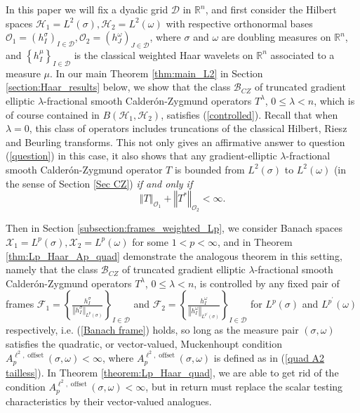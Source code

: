 \documentclass{amsart}%
\theoremstyle{plain}
\numberwithin{equation}{section}
\begin{document}
In this paper we will fix a dyadic grid $\mathcal{D}$ in $\mathbb{R}^{n}$, and
first consider the  Hilbert spaces $\mathcal{H}_{1}=L^{2}\left(  \sigma\right)
,\mathcal{H}_{2}=L^{2}\left(  \omega\right)  $ with respective orthonormal
bases $\mathcal{O}_{1}=\left(  h_{I}^{\sigma}\right)  _{I\in\mathcal{D}%
},\mathcal{O}_{2}=\left(  h_{J}^{\omega}\right)  _{J\in\mathcal{D}}$, where
$\sigma$ and $\omega$ are doubling measures on $\mathbb{R}^{n}$, and $\left\{
h_{I}^{\mu}\right\}  _{I\in\mathcal{D}}$ is the classical weighted Haar
wavelets on $\mathbb{R}^{n}$ associated to a measure $\mu$. In our main Theorem \ref{thm:main_L2} in Section \ref{section:Haar_results} below, we show that the
class $\mathcal{B}_{CZ}$ of truncated gradient elliptic $\lambda$-fractional
smooth Calder\'{o}n-Zygmund operators $T^{\lambda}$, $0\leq\lambda<n$, which is of course
contained in $B\left(  \mathcal{H}_{1},\mathcal{H}_{2}\right)  $, satisfies (\ref{controlled}). Recall that when $\lambda=0$, this class of
operators includes truncations of the classical Hilbert, Riesz and Beurling transforms.
This not only gives an affirmative answer to question (\ref{question}) in this
case, it also shows that any gradient-elliptic $\lambda$-fractional smooth
Calder\'{o}n-Zygmund operator $T$ is bounded from $L^{2}\left(  \sigma\right)
$ to $L^{2}\left(  \omega\right)  $ (in the sense of Section \ref{Sec CZ}) \emph{if and
only if}
\[
\left\Vert T\right\Vert _{\mathcal{O}_{1}}+\left\Vert T^{\ast}\right\Vert
_{\mathcal{O}_{2}}<\infty.
\]

Then in Section \ref{subsection:frames_weighted_Lp}, we consider Banach spaces $\mathcal{X}_{1}=L^{p}\left(  \sigma\right)
,\mathcal{X}_{2}=L^{p}\left(  \omega\right)  $ for some $1<p<\infty$, and in
Theorem \ref{thm:Lp_Haar_Ap_quad} demonstrate the analogous theorem in this
setting, namely that the class $\mathcal{B}_{CZ}$ of truncated gradient
elliptic $\lambda$-fractional smooth Calder\'{o}n-Zygmund operators $T^{\lambda}$,
$0\leq\lambda<n$, is controlled by any fixed pair of frames $\mathcal{F}%
_{1}=\left\{  \frac{h_{I}^{\sigma}}{\left\Vert h_{I}^{\sigma}\right\Vert
_{L^{p}\left(  \sigma\right)  }}\right\}  _{I\in\mathcal{D}}$ and
$\mathcal{F}_{2}=\left\{  \frac{h_{I}^{\omega}}{\left\Vert h_{I}^{\omega
}\right\Vert _{L^{p^{\prime}}\left(  \sigma\right)  }}\right\}  _{I\in
\mathcal{D}}$ for $L^{p}\left(  \sigma\right)  $ and $L^{p^{\prime}}\left(
\omega\right)  $ respectively, i.e. (\ref{Banach frame}) holds, so long as the
measure pair $(\sigma,\omega)$ satisfies the quadratic, or vector-valued,
Muckenhoupt condition $A_{p}^{\ell^{2},\operatorname{offset}}(\sigma
,\omega)<\infty$, where $A_{p}^{\ell^{2},\operatorname{offset}}(\sigma
,\omega)$ is defined as in (\ref{quad A2 tailless}). In Theorem
\ref{theorem:Lp_Haar_quad}, we are able to get rid of the condition
$A_{p}^{\ell^{2},\operatorname{offset}}(\sigma,\omega)<\infty$, but in return
must replace the scalar testing characteristics by their vector-valued analogues.
\end{document}
